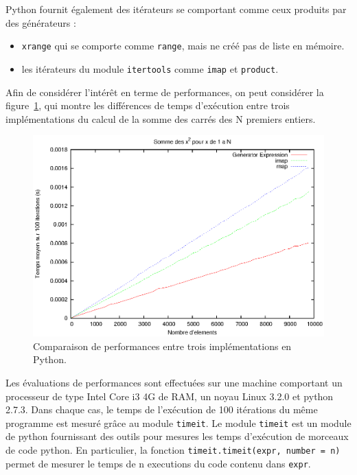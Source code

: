 \documentclass[a4paper]{article}
\begin{document}
Python fournit également des itérateurs se comportant comme ceux
produits par des générateurs :

\begin{itemize}
\item \texttt{xrange} qui se comporte comme \texttt{range}, mais ne
  créé pas de liste en mémoire.
\item les itérateurs du module \texttt{itertools} comme \texttt{imap}
  et \texttt{product}.
\end{itemize}

Afin de considérer l'intérêt en terme de performances, on peut
considérer la figure~\ref{GenExpMapImapPy}, qui montre les différences
de temps d'exécution entre trois implémentations du calcul de la somme
des carrés des N premiers entiers.

\begin{figure}[h]
  \includegraphics[width=\textwidth]{./Pictures/GenExpMapImapPy}
  \caption{Comparaison de performances entre trois implémentations en Python.}
  \label{GenExpMapImapPy}
\end{figure}

Les évaluations de performances sont effectuées sur une machine
comportant un processeur de type Intel Core i3 4G de RAM, un noyau
Linux 3.2.0 et python 2.7.3.  Dans chaque cas, le temps de l'exécution
de 100 itérations du même programme est mesuré grâce au module
\texttt{timeit}. Le module \texttt{timeit} est un module de python
fournissant des outils pour mesures les temps d'exécution de morceaux
de code python. En particulier, la fonction
\lstinline|timeit.timeit(expr, number = n)| permet de mesurer le temps
de n executions du code contenu dans \texttt{expr}.
\end{document}
